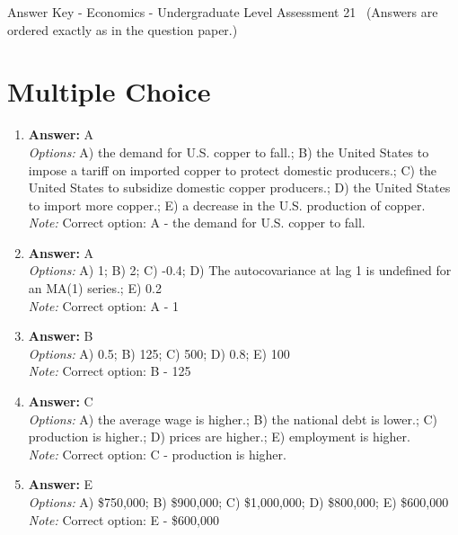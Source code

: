 \documentclass[12pt]{article}
\begin{document}
\begin{center}
Answer Key - Economics - Undergraduate Level Assessment 21 \
\small (Answers are ordered exactly as in the question paper.)
\end{center}

\section*{Multiple Choice}
\begin{enumerate}[label=\arabic*.]
\item \textbf{Answer:} A
\\ \textit{Options:} A) the demand for U.S. copper to fall.; B) the United States to impose a tariff on imported copper to protect domestic producers.; C) the United States to subsidize domestic copper producers.; D) the United States to import more copper.; E) a decrease in the U.S. production of copper.
\\ \textit{Note:} Correct option: A - the demand for U.S. copper to fall.
\item \textbf{Answer:} A
\\ \textit{Options:} A) 1; B) 2; C) -0.4; D) The autocovariance at lag 1 is undefined for an MA(1) series.; E) 0.2
\\ \textit{Note:} Correct option: A - 1
\item \textbf{Answer:} B
\\ \textit{Options:} A) 0.5; B) 125; C) 500; D) 0.8; E) 100
\\ \textit{Note:} Correct option: B - 125
\item \textbf{Answer:} C
\\ \textit{Options:} A) the average wage is higher.; B) the national debt is lower.; C) production is higher.; D) prices are higher.; E) employment is higher.
\\ \textit{Note:} Correct option: C - production is higher.
\item \textbf{Answer:} E
\\ \textit{Options:} A) \$750,000; B) \$900,000; C) \$1,000,000; D) \$800,000; E) \$600,000
\\ \textit{Note:} Correct option: E - \$600,000
\end{enumerate}
\end{document}
